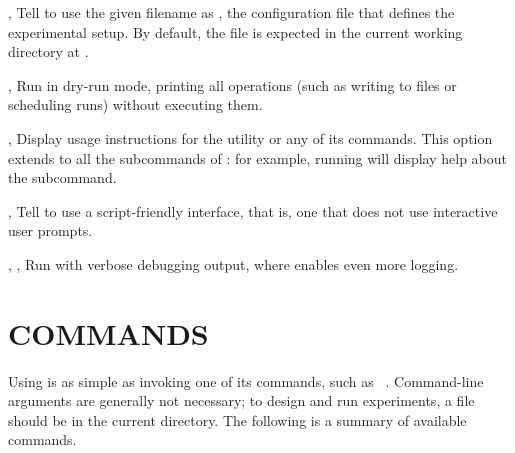 \documentclass[a4paper,english]{article}
\begin{document}
\begin{adjustwidth}{18pt}{0pt}
        \begin{Description}[Options]
            \item[\OptArg{-c}{ filename}, \OptArg{\ddash config}{ filename}]
            Tell  to use the given filename as , the configuration
            file that defines the experimental setup.
            By default, the file is expected in the current working directory at .
            \item[\Opt{-d}, \Opt{\ddash dry-run}]
            Run  in dry-run mode, printing all operations (such as writing to files or scheduling runs)
            without executing them.
            \item[\Opt{-h}, \Opt{\ddash help}]
            Display usage instructions for the  utility or any of its commands.
            This option extends to all the subcommands of : for example, running
               will display help about the  subcommand.
            \item[\Opt{-s}, \Opt{\ddash script}]
            Tell  to use a script-friendly interface, that is, one that does not use
            interactive user prompts.
            \item[\Opt{-v}, \Opt{-vv}, \Opt{\ddash verbose}]
            Run  with verbose debugging output, where  enables even more logging.
        \end{Description}

    \section{COMMANDS}

        Using  is as simple as invoking one of its commands, such as
        ~.
        Command-line arguments are generally not necessary; to design and run
        experiments, a  file should be in the current directory.
        The following is a summary of available commands.


\end{adjustwidth}
\end{document}
